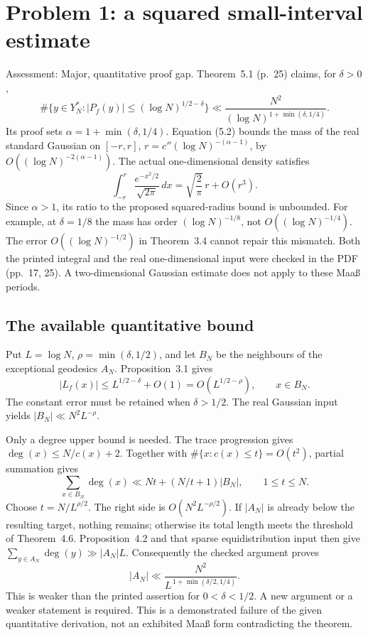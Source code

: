 \documentclass[10pt]{article}
\begin{document}
\section*{Problem 1: a squared small-interval estimate}
Assessment: Major, quantitative proof gap. Theorem 5.1 (p. 25) claims, for \(\delta>0\), \[\#\{y\in Y_N^*:|P_f(y)|\le(\log N)^{1/2-\delta}\}
 \ll \frac{N^2}{(\log N)^{1+\min(\delta,1/4)}}.\] Its proof sets \(\alpha=1+\min(\delta,1/4)\). Equation (5.2) bounds the mass of the real standard Gaussian on \([-r,r]\), \(r=c''(\log N)^{-(\alpha-1)}\), by \(O((\log N)^{-2(\alpha-1)})\). The actual one-dimensional density satisfies \[\int_{-r}^{r}\frac{e^{-x^2/2}}{\sqrt{2\pi}}\,dx
 =\sqrt{\frac2\pi}\,r+O(r^3).\] Since \(\alpha>1\), its ratio to the proposed squared-radius bound is unbounded. For example, at \(\delta=1/8\) the mass has order \((\log N)^{-1/8}\), not \(O((\log N)^{-1/4})\). The error \(O((\log N)^{-1/2})\) in Theorem 3.4 cannot repair this mismatch. Both the printed integral and the real one-dimensional input were checked in the PDF (pp. 17, 25). A two-dimensional Gaussian estimate does not apply to these Maaß periods.\par
\subsection*{The available quantitative bound}
Put \(L=\log N\), \(\rho=\min(\delta,1/2)\), and let \(B_N\) be the neighbours of the exceptional geodesics \(A_N\). Proposition 3.1 gives \[|L_f(x)|\le L^{1/2-\delta}+O(1)
           =O(L^{1/2-\rho}),\qquad x\in B_N.\] The constant error must be retained when \(\delta>1/2\). The real Gaussian input yields \(|B_N|\ll N^2L^{-\rho}\).\par
Only a degree upper bound is needed. The trace progression gives \(\deg(x)\le N/c(x)+2\). Together with \(\#\{x:c(x)\le t\}=O(t^2)\), partial summation gives \[\sum_{x\in B_N}\deg(x)
 \ll Nt+(N/t+1)|B_N|,\qquad 1\le t\le N.\] Choose \(t=N/L^{\rho/2}\). The right side is \(O(N^2L^{-\rho/2})\). If \(|A_N|\) is already below the resulting target, nothing remains; otherwise its total length meets the threshold of Theorem 4.6. Proposition 4.2 and that sparse equidistribution input then give \(\sum_{y\in A_N}\deg(y)\gg |A_N|L\). Consequently the checked argument proves \[|A_N|\ll
 \frac{N^2}{L^{\,1+\min(\delta/2,1/4)}}.\] This is weaker than the printed assertion for \(0<\delta<1/2\). A new argument or a weaker statement is required. This is a demonstrated failure of the given quantitative derivation, not an exhibited Maaß form contradicting the theorem.\par
\end{document}
